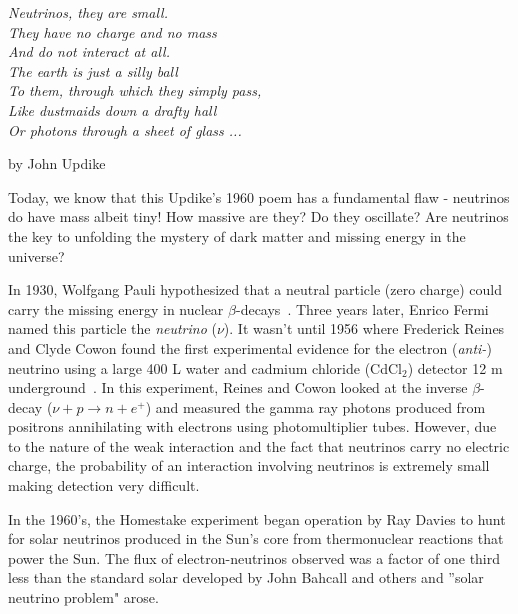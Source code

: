\begin{center}
\textit{Neutrinos, they are small. \\
They have no charge and no mass \\
And do not interact at all. \\
The earth is just a silly ball \\
To them, through which they simply pass, \\
Like dustmaids down a drafty hall \\
Or photons through a sheet of glass ...\\}
\end{center}
\begin{flushright}
by John Updike~\cite{Updike.1960}\hspace{-10pt}
\end{flushright}

Today, we know that this Updike's 1960 poem has a fundamental flaw - neutrinos do have mass albeit tiny!  How massive are they?  Do they oscillate?  Are neutrinos the key to unfolding the mystery of dark matter and missing energy in the universe?

\par In 1930, Wolfgang Pauli hypothesized that a neutral particle (zero charge) could carry the missing energy in nuclear $\beta$-decays~\cite{Fermi.1934}.  Three years later, Enrico Fermi named this particle the \emph{neutrino} ($\nu$).  It wasn't until 1956 where Frederick Reines and Clyde Cowon found the first experimental evidence for the electron (\textit{anti-}) neutrino using a large 400 L water and cadmium chloride (CdCl$_{2}$) detector 12 m underground~\cite{Reines.1960}.  In this experiment, Reines and Cowon looked at the inverse $\beta$-decay ($\nu + p \rightarrow n + e^{+}$) and measured the gamma ray photons produced from positrons annihilating with electrons using photomultiplier tubes.  However, due to the nature of the weak interaction and the fact that neutrinos carry no electric charge, the probability of an interaction involving neutrinos is extremely small making detection very difficult.

\par In the 1960's, the Homestake experiment began operation by Ray Davies to hunt for solar neutrinos produced in the Sun's core from thermonuclear reactions that power the Sun.  The flux of electron-neutrinos observed was a factor of one third less than the standard solar developed by John Bahcall and others and ''solar neutrino problem" arose.

